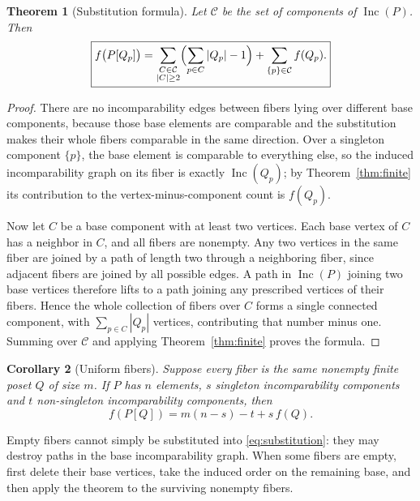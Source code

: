 \documentclass[11pt,letterpaper]{article}
\newtheorem{theorem}{Theorem}[section]
\newtheorem{corollary}[theorem]{Corollary}
\theoremstyle{definition}
\theoremstyle{remark}
\newcommand{\Inc}{\operatorname{Inc}}
\begin{document}
\begin{theorem}[Substitution formula]\label{thm:substitution}
Let $\mathcal C$ be the set of components of $\Inc(P)$. Then
\begin{equation}\label{eq:substitution}
 \boxed{\displaystyle
 f\bigl(P[Q_p]\bigr)=
 \sum_{\substack{C\in\mathcal C\\|C|\ge2}}
   \Bigl(\sum_{p\in C}|Q_p|-1\Bigr)
 +\sum_{\{p\}\in\mathcal C}f(Q_p).}
\end{equation}
\end{theorem}
\begin{proof}
There are no incomparability edges between fibers lying over different base
components, because those base elements are comparable and the substitution
makes their whole fibers comparable in the same direction. Over a singleton
component $\{p\}$, the base element is comparable to everything else, so the
induced incomparability graph on its fiber is exactly $\Inc(Q_p)$; by
Theorem~\ref{thm:finite} its contribution to the vertex-minus-component
count is $f(Q_p)$.

Now let $C$ be a base component with at least two vertices. Each base vertex
of $C$ has a neighbor in $C$, and all fibers are nonempty. Any two vertices
in the same fiber are joined by a path of length two through a neighboring
fiber, since adjacent fibers are joined by all possible edges. A path in
$\Inc(P)$ joining two base vertices therefore lifts to a path joining any
prescribed vertices of their fibers. Hence the whole collection of fibers
over $C$ forms a single connected component, with $\sum_{p\in C}|Q_p|$
vertices, contributing that number minus one. Summing over $\mathcal C$ and
applying Theorem~\ref{thm:finite} proves the formula.
\end{proof}

\begin{corollary}[Uniform fibers]\label{cor:uniform}
Suppose every fiber is the same nonempty finite poset $Q$ of size $m$. If
$P$ has $n$ elements, $s$ singleton incomparability components and $t$
non-singleton incomparability components, then
\[
 f(P[Q])=m(n-s)-t+s\,f(Q).
\]
\end{corollary}

Empty fibers cannot simply be substituted into \eqref{eq:substitution}:
they may destroy paths in the base incomparability graph. When some fibers
are empty, first delete their base vertices, take the induced order on the
remaining base, and then apply the theorem to the surviving nonempty fibers.
\end{document}
